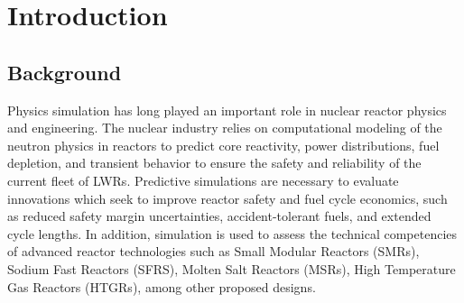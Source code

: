 \chapter{Introduction}
\label{chap:intro}

\section{Background}
\label{sec:chap1-background}



Physics simulation has long played an important role in nuclear reactor physics and engineering. The nuclear industry relies on computational modeling of the neutron physics in reactors to predict core reactivity, power distributions, fuel depletion, and transient behavior to ensure the safety and reliability of the current fleet of \ac{LWRs}. Predictive simulations are necessary to evaluate innovations which seek to improve reactor safety and fuel cycle economics, such as reduced safety margin uncertainties, accident-tolerant fuels, and extended cycle lengths. In addition, simulation is used to assess the technical competencies of advanced reactor technologies such as Small Modular Reactors (SMRs), Sodium Fast Reactors (SFRS), Molten Salt Reactors (MSRs), High Temperature Gas Reactors (HTGRs), among other proposed designs. 


